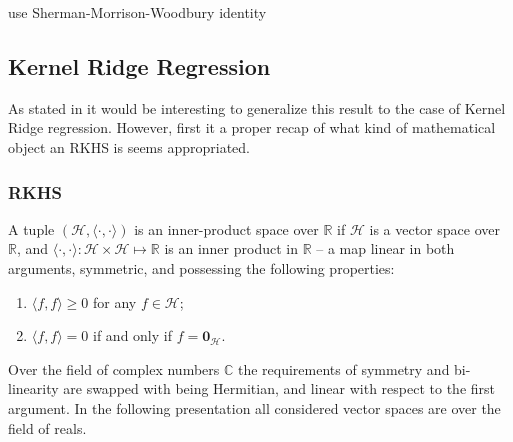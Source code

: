 \documentclass[a4paper,14pt]{article}
\newcommand{\nil}{\mathbf{0}}
\newcommand{\Hcal}{\mathcal{H}}
\newcommand{\Real}{\mathbb{R}}
\newcommand{\Cplx}{\mathbb{C}}
\begin{document}






use Sherman-Morrison-Woodbury identity

\subsection{Kernel Ridge Regression} %
\label{sub:kernel_ridge_regression}

As stated in \cite{BurVovk2014} it would be interesting to generalize this result
to the case of Kernel Ridge regression. However, first it a proper recap of what 
kind of mathematical object an RKHS is seems appropriated.

\subsubsection{RKHS} %
\label{ssub:rkhs}

A tuple $(\Hcal, \langle\cdot, \cdot\rangle)$ is an inner-product space over $\Real$
if $\Hcal$ is a vector space over $\Real$, and $\langle\cdot, \cdot\rangle : \Hcal
\times \Hcal \mapsto \Real$ is an inner product in $\Real$ -- a map linear in both
arguments, symmetric, and possessing the following properties:
\begin{enumerate}
  \item $\langle f, f\rangle\geq 0$ for any $f\in \Hcal$;
  \item $\langle f, f\rangle = 0$ if and only if $f = \nil_\Hcal$.
\end{enumerate}
Over the field of complex numbers $\Cplx$ the requirements of symmetry and bi-
linearity are swapped with being Hermitian, and linear with respect to the first
argument. In the following presentation all considered vector spaces are over the
field of reals.
\end{document}
